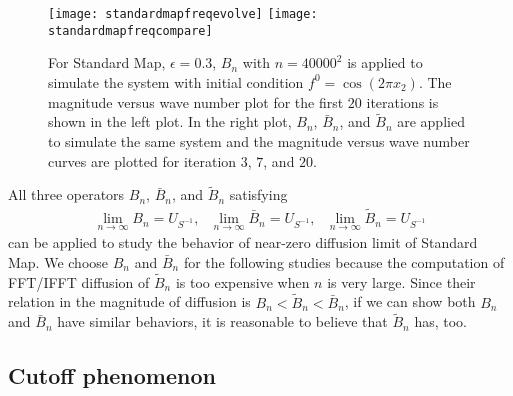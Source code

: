 \begin{figure}

    \centerline{
      \texttt{[image: standardmapfreqevolve]}
      \texttt{[image: standardmapfreqcompare]}
    }
    \caption{\label{freqcompare}For Standard Map, $\epsilon = 0.3$, $B_n$ with $n=40000^2$ is applied to simulate the system with initial condition $f^0=\cos(2\pi x_2)$. The magnitude versus wave number plot for the first $20$ iterations is shown in the left plot. In the right plot, $B_n$, $\bar{B}_n$, and $\tilde{B}_n$ are applied to simulate the same system and the magnitude versus wave number curves are plotted for iteration $3$, $7$, and $20$.  }
\end{figure}

All three operators $B_n$, $\bar{B}_n$, and $\tilde{B}_n$ satisfying
\begin{eqnarray*}
  \lim_{n \rightarrow \infty} B_n= U_{S^{-1}}, \mbox{  }  \lim_{n \rightarrow \infty} \bar{B}_n= U_{S^{-1}}, \mbox{  }  \lim_{n \rightarrow \infty} \tilde{B}_n=U_{S^{-1}}
 \end{eqnarray*}
can be applied to study the behavior of near-zero diffusion limit of Standard Map. We choose
$B_n$ and $\bar{B}_n$ for the following studies because the computation of FFT/IFFT diffusion of $\tilde{B}_n$ is too expensive when $n$ is very large. Since their relation in the magnitude of diffusion is $B_n<\tilde{B}_n<\bar{B}_n$, if we can show both $B_n$ and $\bar{B}_n$ have similar behaviors, it is reasonable to believe that $\tilde{B}_n$ has, too.

\subsection{Cutoff phenomenon}


